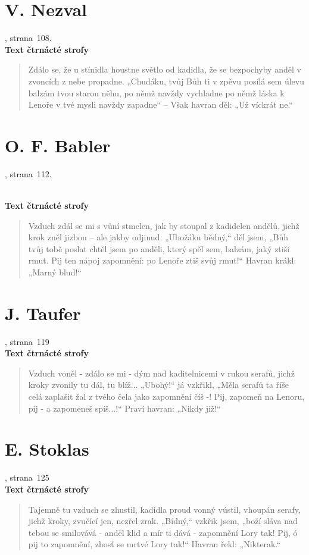 \documentclass[dp.tex]{subfiles}
\begin{document}
\section*{V. Nezval}
, strana~108.
\\\textbf{Text čtrnácté strofy}
\begin{verse}
Zdálo se, že u stínidla houstne světlo od kadidla,
že se bezpochyby anděl v zvoncích z nebe propadne.
„Chudáku, tvůj Bůh ti v zpěvu posílá sem úlevu
balzám tvou starou něhu, po němž navždy vychladne
po němž láska k Lenoře v tvé mysli navždy zapadne“ –
Však havran děl: „Už víckrát ne.“
\end{verse}

\section*{O. F. Babler}
, strana~112.
\begin{samepage}
\\\textbf{Text čtrnácté strofy}
\begin{verse}
Vzduch zdál se mi s vůní stmelen, jak by stoupal z kadidelen
andělů, jichž krok zněl jizbou – ale jakby odjinud.
„Ubožáku bědný,“ děl jsem, „Bůh tvůj tobě poslat chtěl jsem
po anděli, který spěl sem, balzám, jaký ztiší rmut.
Pij ten nápoj zapomnění: po Lenoře ztiš svůj rmut!“
Havran krákl: „Marný blud!“
\end{verse}
\end{samepage}

\section*{J. Taufer}
, strana~119
\\\textbf{Text čtrnácté strofy}
\begin{verse}
Vzduch voněl - zdálo se mi - dým nad kaditelnicemi
v rukou serafů, jichž kroky zvonily tu dál, tu blíž...
„Ubohý!“ já vzkřikl, „Měla serafů ta říše celá
zaplašit žal z tvého čela jako zapomnění číš -!
Pij, zapomeň na Lenoru, pij - a zapomeneš spíš...!“
Praví havran: „Nikdy již!“
\end{verse}

\section*{E. Stoklas}
, strana~125
\\\textbf{Text čtrnácté strofy}
\begin{verse}
Tajemně tu vzduch se zhustil, kadidla proud vonný vústil,
vhoupán serafy, jichž kroky, zvučící jen, nezřel zrak.
„Bídný,“ vzkřik jsem, „boží sláva nad tebou se smilovává -
anděl klid a mír ti dává - zapomnění Lory tak!
Pij, ó pij to zapomnění, zhosť se mrtvé Lory tak!“
Havran řekl: „Nikterak.“
\end{verse}
\end{document}
